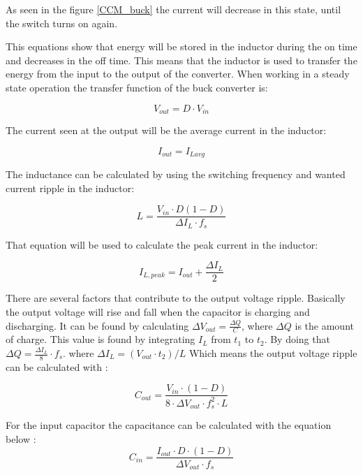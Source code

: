 As seen in the figure \ref{CCM_buck} the current will decrease in this state, until the switch turns on again.

This equations show that energy will be stored in the inductor during the on time and decreases in the off time. This means that the inductor is used to transfer the energy from the input to the output of the converter. 
When working in a steady state operation the transfer function of the buck converter is:

\begin{equation}
V_{out} = D\cdot V_{in}
\end{equation}

\noindent The current seen at the output will be the average current in the inductor:

\begin{equation} \label{Iavg}
I_{out}=I_{Lavg}
\end{equation}

The inductance can be calculated by using the switching frequency and wanted current ripple in the inductor:

\begin{equation}\label{buckind}
L = \frac{V_{in}\cdot D(1-D)}{\Delta I_L \cdot f_s}
\end{equation}

\noindent That equation will be used to calculate the peak current in the inductor:

\begin{equation}
I_{L,peak} = I_{out} + \frac{\Delta I_{L}}{2}
\end{equation}

There are several factors that contribute to the output voltage ripple. Basically the output voltage will rise and fall when the capacitor is charging and discharging. It can be found by calculating $\Delta V_{out} = \frac{\Delta Q}{C}$, where $\Delta Q$ is the amount of charge. This value is found by integrating $I_L$ from $t_1$ to $t_2$. By doing that $\Delta Q = \frac{\Delta I_L}{8}\cdot f_s$. where $\Delta I_L = (V_{out}\cdot t_2)/L$ Which means the output voltage ripple can be calculated with \cite{buck_equation}:
 
\begin{equation} \label{buckc} 
C_{out} = \frac{V_{in}\cdot (1-D)}{8\cdot \Delta V_{out}\cdot f_s^2\cdot L}  
\end{equation}     

For the input capacitor the capacitance can be calculated with the equation below \cite{underthehood}:
\begin{equation}
\label{buckcin}
C_{in} = \frac{I_{out}\cdot D\cdot (1-D)}{\Delta V_{out}\cdot f_s}
\end{equation}   

